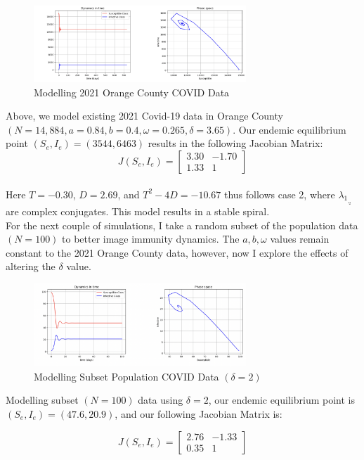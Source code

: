 \documentclass[%
 reprint,
]{revtex4-2}
\begin{document}
\begin{figure}[h]
\caption{Modelling 2021 Orange County COVID Data}
\centering
\includegraphics[width=80mm,scale=0.5]{2021-OrangeCountyData.png}
\end{figure}

Above, we model existing 2021 Covid-19 data in Orange County $(N=14,884, a=0.84,b=0.4, \omega = 0.265, \delta = 3.65)$. Our endemic equilibrium point $(S_e,I_e) = (3544, 6463)$ results in the following Jacobian Matrix: \\
\begin{equation}
J(S_e,I_e) = \begin{bmatrix} 
3.30 & -1.70 \\
1.33 & 1 \end{bmatrix}
\end{equation} \\
Here $T=-0.30$, $D=2.69$, and $T^2-4D=-10.67$ thus follows case 2, where $\lambda_1_,_2$ are complex conjugates. This model results in a stable spiral. \\

For the next couple of simulations, I take a random subset of the population data $(N=100)$ to better image immunity dynamics. The $a, b, \omega$ values remain constant to the 2021 Orange County data, however, now I explore the effects of altering the $\delta$ value.

\begin{figure}[h]
\caption{Modelling Subset Population COVID Data $(\delta = 2)$}
\centering
\includegraphics[width=80mm,scale=0.5]{n=100,a=.84,b=.4,d=2.png}
\end{figure}

Modelling subset $(N=100)$ data using $\delta = 2$, our endemic equilibrium point is $(S_e, I_e)= (47.6,20.9)$, and our following Jacobian Matrix is: 

\begin{equation}
J(S_e,I_e) = \begin{bmatrix} 
2.76 & -1.33 \\
0.35 & 1 \end{bmatrix}
\end{equation} \\
\end{document}
